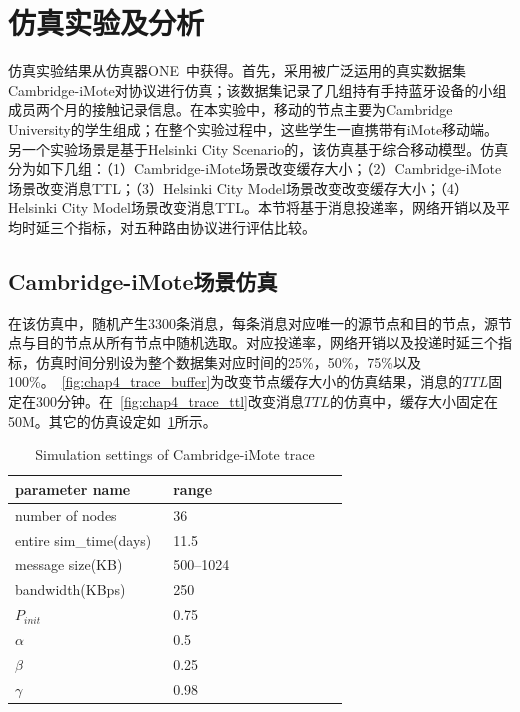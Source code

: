 \section{仿真实验及分析}
\label{chap4:仿真实验}

仿真实验结果从仿真器ONE~中获得。首先，采用被广泛运用的真实数据集Cambridge-iMote对协议进行仿真；该数据集记录了几组持有手持蓝牙设备的小组成员两个月的接触记录信息。在本实验中，移动的节点主要为Cambridge University的学生组成；在整个实验过程中，这些学生一直携带有iMote移动端。另一个实验场景是基于Helsinki City Scenario的，该仿真基于综合移动模型。仿真分为如下几组：（1）Cambridge-iMote场景改变缓存大小；（2）Cambridge-iMote场景改变消息TTL；（3）Helsinki City Model场景改变改变缓存大小；（4）Helsinki City Model场景改变消息TTL。本节将基于消息投递率，网络开销以及平均时延三个指标，对五种路由协议进行评估比较。

\subsection{Cambridge-iMote场景仿真}

在该仿真中，随机产生3300条消息，每条消息对应唯一的源节点和目的节点，源节点与目的节点从所有节点中随机选取。对应投递率，网络开销以及投递时延三个指标，仿真时间分别设为整个数据集对应时间的25\%，50\%，75\%以及100\%。\figurename~\ref{fig:chap4_trace_buffer}为改变节点缓存大小的仿真结果，消息的$TTL$固定在300分钟。在\figurename~\ref{fig:chap4_trace_ttl}改变消息$TTL$的仿真中，缓存大小固定在50M。其它的仿真设定如\tablename~\ref{tab:chap4_simulation}所示。


\begin{table}
\centering
\caption{Simulation settings of Cambridge-iMote trace}
\label{tab:chap4_simulation}
\begin{tabular}{
p{0.45\linewidth}<{\centering}
p{0.5\linewidth}<{\centering}
}
\hline
\textbf{parameter name} & \textbf{range} \\
\hline
number of nodes & 36  \\
entire sim\_time(days) & 11.5 \\
message size(KB) & 500--1024 \\
bandwidth(KBps) & 250 \\
$P_{init}$ & 0.75 \\
$\alpha$ & 0.5 \\
$\beta$ & 0.25 \\
$\gamma$ & 0.98 \\
\hline
\end{tabular}
\end{table}


